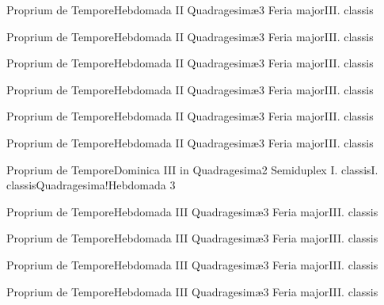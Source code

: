 \documentclass[liber-responsorialis_temporale.tex]{subfiles}
\begin{document}
	{Proprium de Tempore}{Hebdomada II Quadragesimæ}{3}{}
	{Feria major}{III. classis}{}
	{}
	{}

	{Proprium de Tempore}{Hebdomada II Quadragesimæ}{3}{}
	{Feria major}{III. classis}{}
	{}
	{}

	{Proprium de Tempore}{Hebdomada II Quadragesimæ}{3}{}
	{Feria major}{III. classis}{}
	{}
	{}

	{Proprium de Tempore}{Hebdomada II Quadragesimæ}{3}{}
	{Feria major}{III. classis}{}
	{}
	{}

	{Proprium de Tempore}{Hebdomada II Quadragesimæ}{3}{}
	{Feria major}{III. classis}{}
	{}
	{}

	{Proprium de Tempore}{Hebdomada II Quadragesimæ}{3}{}
	{Feria major}{III. classis}{}
	{}
	{}

	{Proprium de Tempore}{Dominica III in Quadragesima}{2}{}
	{Semiduplex I. classis}{I. classis}{Quadragesima!Hebdomada 3}
	{}
	{}

	{Proprium de Tempore}{Hebdomada III Quadragesimæ}{3}{}
	{Feria major}{III. classis}{}
	{}
	{}

	{Proprium de Tempore}{Hebdomada III Quadragesimæ}{3}{}
	{Feria major}{III. classis}{}
	{}
	{}

	{Proprium de Tempore}{Hebdomada III Quadragesimæ}{3}{}
	{Feria major}{III. classis}{}
	{}
	{}

	{Proprium de Tempore}{Hebdomada III Quadragesimæ}{3}{}
	{Feria major}{III. classis}{}
	{}
	{}
\end{document}
